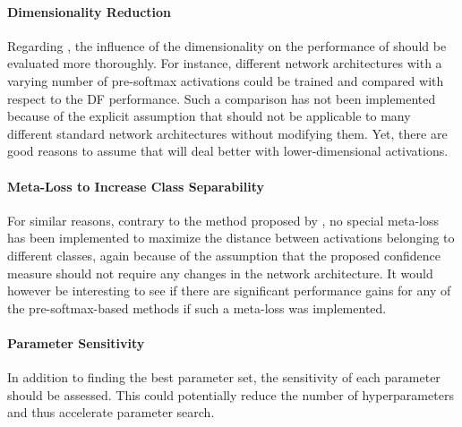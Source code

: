 \documentclass[10pt]{article}
\begin{document}
\paragraph{Dimensionality Reduction} Regarding , the influence of the dimensionality on the performance of  should be evaluated more thoroughly. For instance, different network architectures with a varying number of pre-softmax activations could be trained and compared with respect to the \acrlong{DF} performance. Such a comparison has not been implemented because of the explicit assumption that  should not be applicable to many different standard network architectures without modifying them. Yet, there are good reasons to assume that  will deal better with lower-dimensional activations.

\paragraph{Meta-Loss to Increase Class Separability} For similar reasons, contrary to the method proposed by \textcite{mandelbaum17}, no special meta-loss has been implemented to maximize the distance between activations belonging to different classes, again because of the assumption that the proposed confidence measure should not require any changes in the network architecture. It would however be interesting to see if there are significant performance gains for any of the pre-softmax-based methods if such a meta-loss was implemented. 

\paragraph{Parameter Sensitivity} In addition to finding the best parameter set, the sensitivity of each parameter should be assessed. This could potentially reduce the number of hyperparameters and thus accelerate parameter search.

\end{document}
